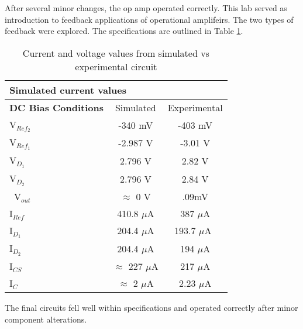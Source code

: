 
After several minor changes, the op amp operated correctly. This lab served as introduction to feedback applications of operational amplifeirs. The two types of feedback were explored. The specifications are outlined in Table \ref{tab:specs}.

\begin{table}[H]
	\centering
	\caption{Current and voltage values from simulated vs experimental circuit}
	\label{tab:specs}
	\begin{tabular}{|l|c|c|}
		\hline
		\multicolumn{3}{|l|}{Simulated current values}                            \\ \hline
		\textbf{DC Bias Conditions} & Simulated & Experimental        \\ \hline
		V$_{Ref_2}$ & -340 mV      & -403 mV                                        \\ \hline
		V$_{Ref_1}$ & -2.987 V       & -3.01 V                        	   \\ \hline
		V$_{D_1}$ & 2.796 V          & 2.82 V                              	       	       \\ \hline
		V$_{D_2}$  & 2.796 V                       & 2.84 V                        	   \\ \hline\
		V$_{out}$ & $\approx$ 0 V				& .09mV 						 \\ \hline
		I$_{Ref}$ & 410.8 $\mu$A            & 387 $\mu$A                                       \\ \hline
		I$_{D_1}$ & 204.4 $\mu$A              &  193.7 $\mu$A\                                    \\ \hline
		I$_{D_2}$ & 204.4 $\mu$A                  & 194 $\mu$A                                \\ \hline
		I$_{CS}$  & $\approx$  227 $\mu$A               & 217 $\mu$A                            \\ \hline
		I$_{C}$   & $\approx$ 2  $\mu$A				& 2.23 $\mu$A 						 \\	\hline

	\end{tabular}
\end{table}




The final circuits fell well within specifications and operated correctly after minor component alterations.



